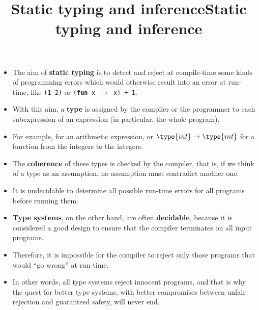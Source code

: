 \documentclass[wide]{slides}
\begin{document}
\begin{slide}
  \title{Static typing and inference}

  \begin{itemize}

    \item The aim of \textbf{static typing} is to detect and reject at
      compile\hyp{}time some kinds of programming errors which would
      otherwise result into an error at run\hyp{}time, like \texttt{(1
        2)} or \texttt{(\textbf{fun} x $\rightarrow$ x) + 1}.

    \item With this aim, a \textbf{type} is assigned by the compiler
      or the programmer to each subexpression of an expression (in
      particular, the whole program).

    \item For example,  for an arithmetic expression, or
      $\type{int} \rightarrow \type{int}$ for a function from the
      integers to the integers.

    \item The \textbf{coherence} of these types is checked by the
      \OCaml compiler, that is, if we think of a type as an
      assumption, no assumption must contradict another one.

  \end{itemize}

\end{slide}

\begin{slide}
  \title{Static typing and inference}

  \begin{itemize}

    \item It is undecidable to determine all possible run\hyp{}time
      errors for all programs before running them.

    \item \textbf{Type systems}, on the other hand, are often
      \textbf{decidable}, because it is considered a good design to
      ensure that the compiler terminates on all input programs.

    \item Therefore, it is impossible for the compiler to reject only
      those programs that would ``go wrong'' at run\hyp{}time.

    \item In other words, all type systems reject innocent programs,
      and that is why the quest for better type systems, with better
      compromises between unfair rejection and guaranteed safety, will
      never end.

  \end{itemize}

\end{slide}
\end{document}
